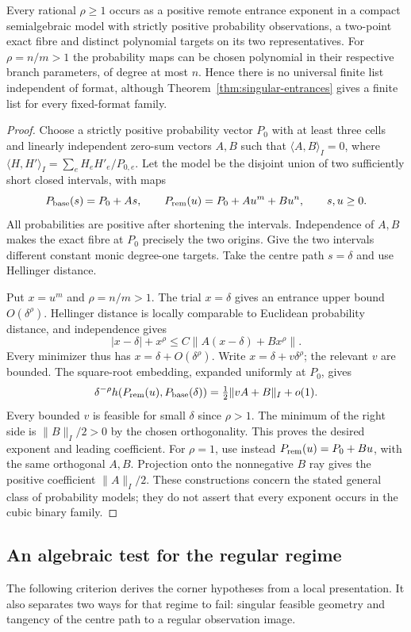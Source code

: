 \begin{theorem}\label{thm:entrance-realization}
Every rational $\rho\ge1$ occurs as a positive remote entrance exponent
in a compact semialgebraic model with strictly positive probability
observations, a two-point exact fibre and distinct polynomial targets
on its two representatives. For $\rho=n/m>1$ the probability maps can
be chosen polynomial in their respective branch parameters, of degree
at most $n$. Hence there is no universal finite list independent of
format, although Theorem~\ref{thm:singular-entrances} gives a finite
list for every fixed-format family.
\end{theorem}
\begin{proof}
Choose a strictly positive probability vector $P_0$ with at least three
cells and linearly independent zero-sum vectors $A,B$ such that
$\langle A,B\rangle_I=0$, where
$\langle H,H'\rangle_I=\sum_eH_eH'_e/P_{0,e}$.
Let the model be the disjoint union of two sufficiently short closed
intervals, with maps
\[
 P_{\rm base}(s)=P_0+As,\qquad
 P_{\rm rem}(u)=P_0+A u^m+B u^n,\qquad s,u\ge0.
\]
All probabilities are positive after shortening the intervals.
Independence of $A,B$ makes the exact fibre at $P_0$ precisely the two
origins. Give the two intervals different constant monic degree-one
targets. Take the centre path $s=\delta$ and use Hellinger distance.

Put $x=u^m$ and $\rho=n/m>1$. The trial $x=\delta$ gives an entrance
upper bound $O(\delta^\rho)$. Hellinger distance is locally comparable
to Euclidean probability distance, and independence gives
\[
 |x-\delta|+x^\rho\le C\|A(x-\delta)+Bx^\rho\|.
\]
Every minimizer thus has $x=\delta+O(\delta^\rho)$. Write
$x=\delta+v\delta^\rho$; the relevant $v$ are bounded. The square-root
embedding, expanded uniformly at $P_0$, gives
\[
 \delta^{-\rho}h(P_{\rm rem}(u),P_{\rm base}(\delta))
     =\tfrac12\|vA+B\|_I+o(1).
\]
Every bounded $v$ is feasible for small $\delta$ since $\rho>1$.
The minimum of the right side is $\|B\|_I/2>0$ by the chosen
orthogonality. This proves the desired exponent and leading coefficient.
For $\rho=1$, use instead $P_{\rm rem}(u)=P_0+Bu$, with the same
orthogonal $A,B$. Projection onto the nonnegative $B$ ray gives the
positive coefficient $\|A\|_I/2$. These constructions concern the
stated general class of probability models; they do not assert that
every exponent occurs in the cubic binary family.
\end{proof}

\subsection{An algebraic test for the regular regime}
The following criterion derives the corner hypotheses from a local
presentation. It also separates two ways for that regime to fail:
singular feasible geometry and tangency of the centre path to a regular
observation image.


